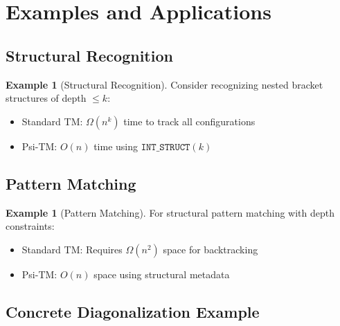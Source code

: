 \documentclass[11pt]{article}
\theoremstyle{definition}
\newtheorem{example}[theorem]{Example}
\begin{document}
\section{Examples and Applications}

\subsection{Structural Recognition}

\begin{example}[Structural Recognition]
Consider recognizing nested bracket structures of depth $\leq k$:
\begin{itemize}
\item Standard TM: $\Omega(n^k)$ time to track all configurations
\item Psi-TM: $O(n)$ time using $\texttt{INT\_STRUCT}(k)$
\end{itemize}
\end{example}

\subsection{Pattern Matching}

\begin{example}[Pattern Matching]
For structural pattern matching with depth constraints:
\begin{itemize}
\item Standard TM: Requires $\Omega(n^2)$ space for backtracking
\item Psi-TM: $O(n)$ space using structural metadata
\end{itemize}
\end{example}

\subsection{Concrete Diagonalization Example}
\end{document}
